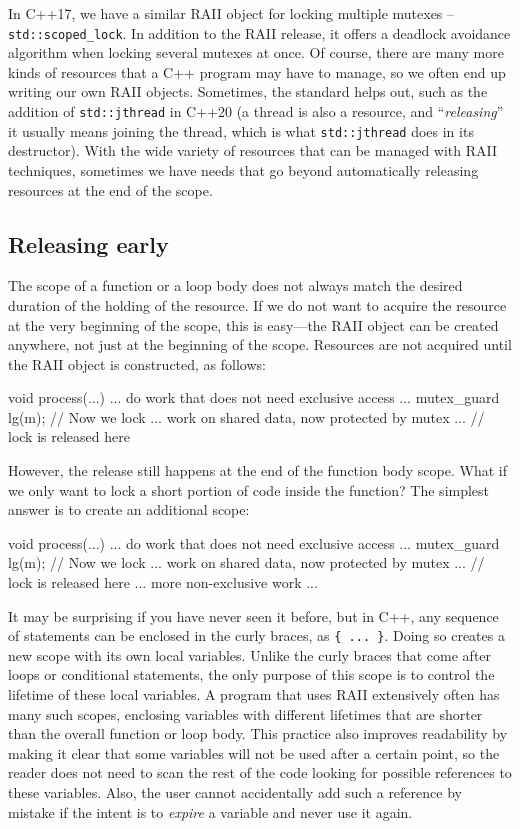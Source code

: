 In C++17, we have a similar RAII object for locking multiple mutexes -- \texttt{std::scoped\_lock}. In addition to the RAII release, it offers a deadlock avoidance algorithm when locking several mutexes at once. Of course, there are many more kinds of resources that a C++ program may have to manage, so we often end up writing our own RAII objects. Sometimes, the standard helps out, such as the addition of \texttt{std::jthread} in C++20 (a thread is also a resource, and ``\emph{releasing}'' it usually means joining the thread, which is what \texttt{std::jthread} does in its destructor). With the wide variety of resources that can be managed with RAII techniques, sometimes we have needs that go beyond automatically releasing resources at the end of the scope.

\subsection{Releasing early}

The scope of a function or a loop body does not always match the desired duration of the holding of the resource. If we do not want to acquire the resource at the very beginning of the scope, this is easy---the RAII object can be created anywhere, not just at the beginning of the scope. Resources are not acquired until the RAII object is constructed, as follows:

\begin{code}
void process(...) {
  ... do work that does not need exclusive access ...
  mutex_guard lg(m);    // Now we lock
  ... work on shared data, now protected by mutex ...
} // lock is released here
\end{code}

However, the release still happens at the end of the function body scope. What if we only want to lock a short portion of code inside the function? The simplest answer is to create an additional scope:

\begin{code}
void process(...) {
  ... do work that does not need exclusive access ...
  {
    mutex_guard lg(m);    // Now we lock
    ... work on shared data, now protected by mutex ...
  } // lock is released here
  ... more non-exclusive work ...
}
\end{code}

It may be surprising if you have never seen it before, but in C++, any sequence of statements can be enclosed in the curly braces, as \texttt{\{\ ...\ \}}. Doing so creates a new scope with its own local variables. Unlike the curly braces that come after loops or conditional statements, the only purpose of this scope is to control the lifetime of these local variables. A program that uses RAII extensively often has many such scopes, enclosing variables with different lifetimes that are shorter than the overall function or loop body. This practice also improves readability by making it clear that some variables will not be used after a certain point, so the reader does not need to scan the rest of the code looking for possible references to these variables. Also, the user cannot accidentally add such a reference by mistake if the intent is to \emph{expire} a variable and never use it again.

